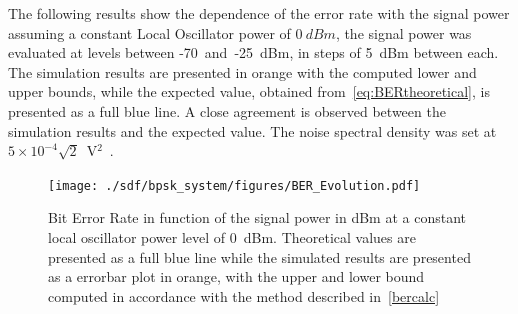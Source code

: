 \begin{refsection}
The following results show the dependence of the error rate with the signal power assuming a constant Local Oscillator power of $0~dBm$, the signal power was evaluated at levels between -70~and~-25~dBm, in steps of 5~dBm between each. The simulation results are presented in orange with the computed lower and upper bounds, while the expected value, obtained from~\eqref{eq:BERtheoretical}, is presented as a full blue line. A close agreement is observed between the simulation results and the expected value. The noise spectral density was set at $5\times10^{-4}\sqrt{2}$~V$^2$~\cite{thorlabs}.
\begin{figure}[H]
\centering
\texttt{[image: ./sdf/bpsk\_system/figures/BER\_Evolution.pdf]}
\caption{Bit Error Rate in function of the signal power in dBm at a constant local oscillator power level of 0~dBm. Theoretical values are presented as a full blue line while the simulated results are presented as a errorbar plot in orange, with the upper and lower bound computed in accordance with the method described in~\ref{bercalc}}
\label{fig:berevolution}
\end{figure}


\clearpage
\printbibliography[heading=subbibliography]
\end{refsection}
\cleardoublepage

